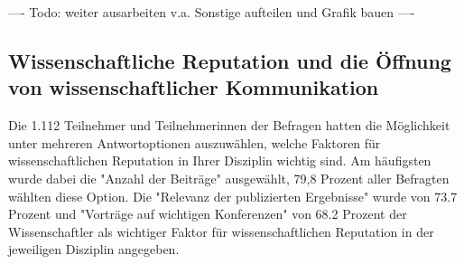 ---- Todo: weiter ausarbeiten v.a. Sonstige aufteilen und Grafik bauen ----

\subsection{Wissenschaftliche Reputation und die Öffnung von wissenschaftlicher Kommunikation}

Die 1.112 Teilnehmer und Teilnehmerinnen der Befragen hatten die Möglichkeit unter mehreren Antwortoptionen auszuwählen, welche Faktoren für wissenschaftlichen Reputation in Ihrer Disziplin wichtig sind. Am häufigsten wurde dabei die "Anzahl der Beiträge" ausgewählt, 79,8 Prozent aller Befragten wählten diese Option. Die "Relevanz der publizierten Ergebnisse" wurde von 73.7 Prozent und "Vorträge auf wichtigen Konferenzen" von 68.2 Prozent der Wissenschaftler als wichtiger Faktor für wissenschaftlichen Reputation in der jeweiligen Disziplin angegeben.

